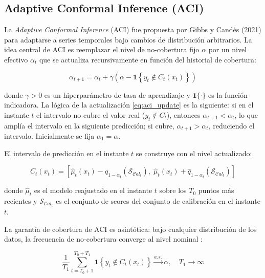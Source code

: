 \subsection{Adaptive Conformal Inference (ACI)}

La \textit{Adaptive Conformal Inference} (ACI) fue propuesta por Gibbs y Candès (2021) \cite{GibbsCP} para adaptarse a series temporales bajo cambios de distribución arbitrarios. La idea central de ACI es reemplazar el nivel de no-cobertura fijo $\alpha$ por un nivel efectivo $\alpha_t$ que se actualiza recursivamente en función del historial de cobertura:

\begin{equation}
    \alpha_{t+1} = \alpha_t + \gamma\left(\alpha - \mathbf{1}\!\left\{y_t \notin C_t(x_t)\right\}\right)
    \label{eq:aci_update}
\end{equation}

donde $\gamma > 0$ es un hiperparámetro de tasa de aprendizaje y $\mathbf{1}\{\cdot\}$ es la función indicadora. La lógica de la actualización \eqref{eq:aci_update} es la siguiente: si en el instante $t$ el intervalo no cubre el valor real ($y_t \notin C_t$), entonces $\alpha_{t+1} < \alpha_t$, lo que amplía el intervalo en la siguiente predicción; si cubre, $\alpha_{t+1} > \alpha_t$, reduciendo el intervalo. Inicialmente se fija $\alpha_1 = \alpha$.

El intervalo de predicción en el instante $t$ se construye con el nivel actualizado:

\begin{equation}
    C_t(x_t) = \left[\hat{\mu}_t(x_t) - \hat{q}_{1-\alpha_t}(\mathcal{S}_{\mathcal{C}al_t}),\; \hat{\mu}_t(x_t) + \hat{q}_{1-\alpha_t}(\mathcal{S}_{\mathcal{C}al_t})\right]
    \label{eq:aci_interval}
\end{equation}

donde $\hat{\mu}_t$ es el modelo reajustado en el instante $t$ sobre los $T_0$ puntos más recientes y $\mathcal{S}_{\mathcal{C}al_t}$ es el conjunto de scores del conjunto de calibración en el instante $t$.

La garantía de cobertura de ACI es asintótica: bajo cualquier distribución de los datos, la frecuencia de no-cobertura converge al nivel nominal \cite{GibbsCP}:

\begin{equation}
    \frac{1}{T_1}\sum_{t=T_0+1}^{T_0+T_1} \mathbf{1}\!\left\{y_t \notin C_t(x_t)\right\} \xrightarrow{a.s.} \alpha, \quad T_1 \to \infty
    \label{eq:aci_asymptotic}
\end{equation}

